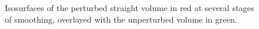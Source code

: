 \begin{figure}[htbp]
    \caption{Isosurfaces of the perturbed straight volume in red at several stages of smoothing, overlayed with the unperturbed volume in green.}
    \label{fig:dummy_contour}
  \end{figure}
  
